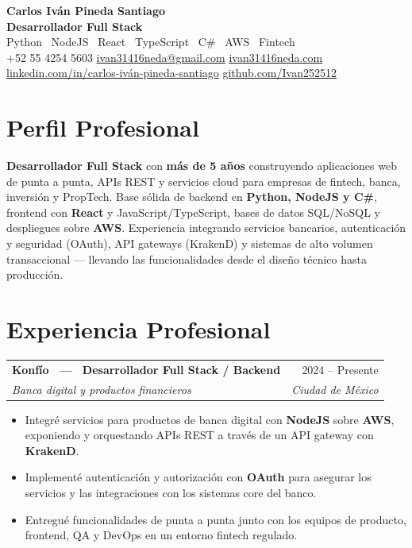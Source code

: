 \documentclass[11pt,a4paper]{article}
\makeatletter
\newcommand{\cventry}[4]{%
  \begin{tabularx}{\linewidth}{@{}X r@{}}
    \textbf{#1} & {\color{muted}#2}\\[2pt]
    {\color{muted}\itshape #3} & {\color{muted}\itshape #4}\\
  \end{tabularx}%
  \vspace{-0.05em}%
}
\newcommand{\sep}{\hspace{0.4em}\textcolor{muted}{\textbullet}\hspace{0.4em}}
\makeatother
\begin{document}
\begin{center}
  {\Huge\bfseries\color{ink} Carlos Iván Pineda Santiago}\\[3pt]
  {\large\color{accent}\bfseries Desarrollador Full Stack}\\[3pt]
  {\color{muted} Python \textperiodcentered\ NodeJS \textperiodcentered\ React \textperiodcentered\ TypeScript \textperiodcentered\ C\# \textperiodcentered\ AWS \textperiodcentered\ Fintech}\\[7pt]
  \small
  +52 55 4254 5603 \sep
  \href{mailto:ivan31416neda@gmail.com}{ivan31416neda@gmail.com} \sep
  \href{https://ivan31416neda.com}{ivan31416neda.com}\\[3pt]
  \href{https://www.linkedin.com/in/carlos-iván-pineda-santiago-325346107/}{linkedin.com/in/carlos-iván-pineda-santiago} \sep
  \href{https://github.com/Ivan252512}{github.com/Ivan252512}
\end{center}

\section{Perfil Profesional}
\textbf{Desarrollador Full Stack} con \textbf{más de 5 años} construyendo aplicaciones web de punta a punta, APIs REST y servicios cloud para empresas de fintech, banca, inversión y PropTech. Base sólida de backend en \textbf{Python, NodeJS y C\#}, frontend con \textbf{React} y JavaScript/TypeScript, bases de datos SQL/NoSQL y despliegues sobre \textbf{AWS}. Experiencia integrando servicios bancarios, autenticación y seguridad (OAuth), API gateways (KrakenD) y sistemas de alto volumen transaccional — llevando las funcionalidades desde el diseño técnico hasta producción.

\section{Experiencia Profesional}

\cventry{Konfío \, — \, Desarrollador Full Stack / Backend}{2024 -- Presente}{Banca digital y productos financieros}{Ciudad de México}
\begin{itemize}
  \item Integré servicios para productos de banca digital con \textbf{NodeJS} sobre \textbf{AWS}, exponiendo y orquestando APIs REST a través de un API gateway con \textbf{KrakenD}.
  \item Implementé autenticación y autorización con \textbf{OAuth} para asegurar los servicios y las integraciones con los sistemas core del banco.
  \item Entregué funcionalidades de punta a punta junto con los equipos de producto, frontend, QA y DevOps en un entorno fintech regulado.
\end{itemize}
\end{document}
